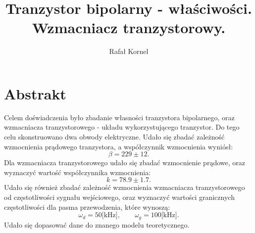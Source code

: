 \documentclass[10pt,a4paper]{article}
\author{Rafał Kornel}
\title{\textbf{Tranzystor bipolarny - właściwości. Wzmacniacz tranzystorowy.}}
\date{}
\begin{document}
\maketitle

\section*{Abstrakt}
Celem doświadczenia było zbadanie własności tranzystora bipolarnego, oraz wzmacniacza tranzystorowego - układu wykorzystującego tranzystor. Do tego celu skonstruowano dwa obwody elektryczne. Udało się zbadać zależność wzmocnienia prądowego tranzystora, a współczynnik wzmocnienia wyniósł: 
$$ \beta = 229 \pm 12 .$$
Dla wzmacniacza tranzystorowego udało się zbadać wzmocnienie prądowe, oraz wyznaczyć wartość współczynnika wzmocnienia:
$$ k = 78.9 \pm 1.7 .$$
Udało się również zbadać zależność wzmocnienia wzmacniacza tranzystorowego od częstotliwości sygnału wejściowego, oraz wyznaczyć wartości granicznych częstotliwości dla pasma przewodzenia, które wynoszą:
$$ \omega_d = 50 \text{[kHz]}, \qquad \omega_g = 100 \text{[kHz]}. $$
Udało się dopasować dane do znanego modelu teoretycznego.
\end{document}
